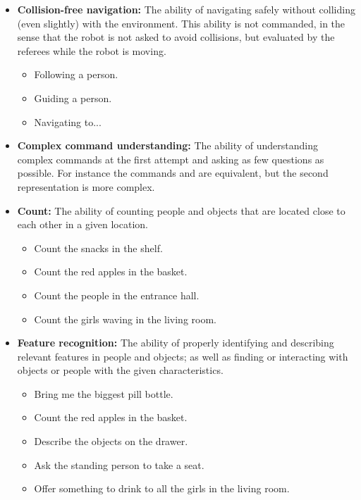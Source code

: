 \begin{itemize}
	\item \textbf{Collision-free navigation:} The ability of navigating safely without colliding (even slightly) with the environment. This ability is not commanded, in the sense that the robot is not asked to avoid collisions, but evaluated by the referees while the robot is moving.
	\begin{itemize}
		\item Following a person.
		\item Guiding a person.
		\item Navigating to...
	\end{itemize}

	\item \textbf{Complex command understanding:} The ability of understanding complex commands at the first attempt and asking as few questions as possible. For instance the commands 
		 and
	are equivalent, but the second representation is more complex. \\

	\item \textbf{Count:} The ability of counting people and objects that are located close to each other in a given location.
	\begin{itemize}
		\item Count the snacks in the shelf.
		\item Count the red apples in the basket.
		\item Count the people in the entrance hall.
		\item Count the girls waving in the living room.
	\end{itemize}

	\item \textbf{Feature recognition:} The ability of properly identifying and describing relevant features in people and objects; as well as finding or interacting with objects or people with the given characteristics.
	\begin{itemize}
		\item Bring me the biggest pill bottle.
		\item Count the red apples in the basket.
		\item Describe the objects on the drawer.
		\item Ask the standing person to take a seat.
		\item Offer something to drink to all the girls in the living room.
	\end{itemize}


\end{itemize}
